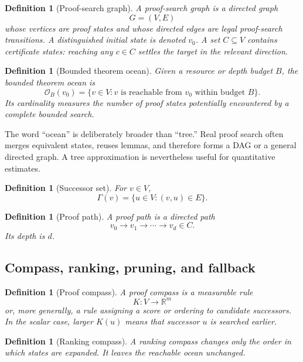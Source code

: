 \documentclass[11pt]{article}
\newtheorem{definition}[theorem]{Definition}
\newcommand{\Ocal}{\mathcal{O}}
\begin{document}
\begin{definition}[Proof-search graph]
A proof-search graph is a directed graph
\[
G=(V,E)
\]
whose vertices are proof states and whose directed edges are legal proof-search transitions. A distinguished initial state is denoted \(v_0\). A set \(C\subseteq V\) contains certificate states: reaching any \(c\in C\) settles the target in the relevant direction.
\end{definition}

\begin{definition}[Bounded theorem ocean]
Given a resource or depth budget \(B\), the bounded theorem ocean is
\[
\Ocal_B(v_0)=\{v\in V:\text{\(v\) is reachable from \(v_0\) within budget \(B\)}\}.
\]
Its cardinality measures the number of proof states potentially encountered by a complete bounded search.
\end{definition}

The word ``ocean'' is deliberately broader than ``tree.'' Real proof search often merges equivalent states, reuses lemmas, and therefore forms a DAG or a general directed graph. A tree approximation is nevertheless useful for quantitative estimates.

\begin{definition}[Successor set]
For \(v\in V\),
\[
\Gamma(v)=\{u\in V:(v,u)\in E\}.
\]
\end{definition}

\begin{definition}[Proof path]
A proof path is a directed path
\[
v_0\to v_1\to\cdots\to v_d\in C.
\]
Its depth is \(d\).
\end{definition}

\subsection{Compass, ranking, pruning, and fallback}

\begin{definition}[Proof compass]
A proof compass is a measurable rule
\[
K:V\to \mathbb{R}^m
\]
or, more generally, a rule assigning a score or ordering to candidate successors. In the scalar case, larger \(K(u)\) means that successor \(u\) is searched earlier.
\end{definition}

\begin{definition}[Ranking compass]
A ranking compass changes only the order in which states are expanded. It leaves the reachable ocean unchanged.
\end{definition}
\end{document}
